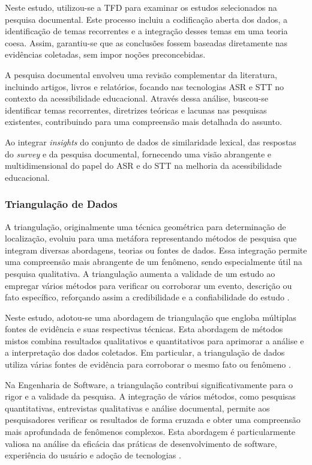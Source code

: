 Neste estudo, utilizou-se a TFD para examinar os estudos selecionados na pesquisa documental. Este processo incluiu a codificação aberta dos dados, a identificação de temas recorrentes e a integração desses temas em uma teoria coesa. Assim, garantiu-se que as conclusões fossem baseadas diretamente nas evidências coletadas, sem impor noções preconcebidas.

A pesquisa documental envolveu uma revisão complementar da literatura, incluindo artigos, livros e relatórios, focando nas tecnologias ASR e STT no contexto da acessibilidade educacional. Através dessa análise, buscou-se identificar temas recorrentes, diretrizes teóricas e lacunas nas pesquisas existentes, contribuindo para uma compreensão mais detalhada do assunto.

Ao integrar \textit{insights} do conjunto de dados de similaridade lexical, das respostas do \textit{survey} e da pesquisa documental, fornecendo uma visão abrangente e multidimensional do papel do ASR e do STT na melhoria da acessibilidade educacional.

\subsubsection{Triangulação de Dados}

A triangulação, originalmente uma técnica geométrica para determinação de localização, evoluiu para uma metáfora representando métodos de pesquisa que integram diversas abordagens, teorias ou fontes de dados. Essa integração permite uma compreensão mais abrangente de um fenômeno, sendo especialmente útil na pesquisa qualitativa. A triangulação aumenta a validade de um estudo ao empregar vários métodos para verificar ou corroborar um evento, descrição ou fato específico, reforçando assim a credibilidade e a confiabilidade do estudo \cite{Farquhar2020, Yin2015}.

Neste estudo, adotou-se uma abordagem de triangulação que engloba múltiplas fontes de evidência e suas respectivas técnicas. Esta abordagem de métodos mistos combina resultados qualitativos e quantitativos para aprimorar a análise e a interpretação dos dados coletados. Em particular, a triangulação de dados utiliza várias fontes de evidência para corroborar o mesmo fato ou fenômeno \cite{Yin2015}.

Na Engenharia de Software, a triangulação contribui significativamente para o rigor e a validade da pesquisa. A integração de vários métodos, como pesquisas quantitativas, entrevistas qualitativas e análise documental, permite aos pesquisadores verificar os resultados de forma cruzada e obter uma compreensão mais aprofundada de fenômenos complexos. Esta abordagem é particularmente valiosa na análise da eficácia das práticas de desenvolvimento de software, experiência do usuário e adoção de tecnologias \cite{Runeson2009}.

